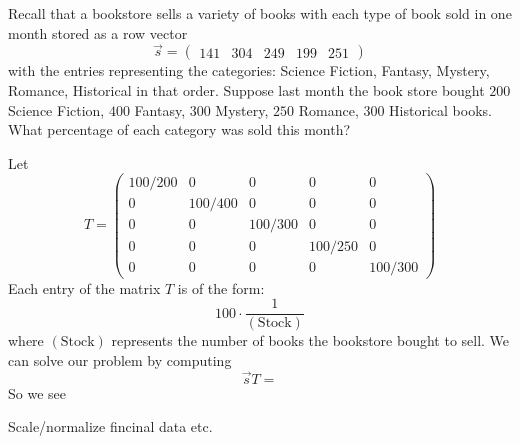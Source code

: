 \documentclass{ximera}
\begin{document}
\begin{example}
  Recall that a bookstore sells a variety of books with each type of
  book sold in one month stored as a row vector
  \[
  \vec{s} = \begin{pmatrix}141 & 304 & 249 & 199 & 251 \end{pmatrix}
  \]
  with the entries representing the categories: Science Fiction,
  Fantasy, Mystery, Romance, Historical in that order.  Suppose last
  month the book store bought $200$ Science Fiction, $400$ Fantasy, $300$
  Mystery, $250$ Romance, $300$ Historical books. What percentage of each
  category was sold this month?
  \begin{explanation}
    Let
    \[
    T =
    \begin{pmatrix}
      100/200 & 0 &    0   &   0    &   0 \\
      0 & 100/400 &    0   &   0    &   0 \\
      0 &   0   &  100/300 &   0    &   0 \\
      0 &   0   &    0   & 100/250  &   0 \\
      0 &   0   &    0   &   0    & 100/300
    \end{pmatrix}
    \]
    Each entry of the matrix $T$ is of the form:
    \[
    100 \cdot \frac{1}{(\text{Stock})}
    \]
    where $(\text{Stock})$ represents the number of books the
    bookstore bought to sell.  We can solve our problem by computing
    \[
    \vec{s} T =
    \]
    So we see
  \end{explanation}

\end{example}




\begin{example}[Navigation]
  Scale/normalize fincinal data etc.
\end{example}
\end{document}
